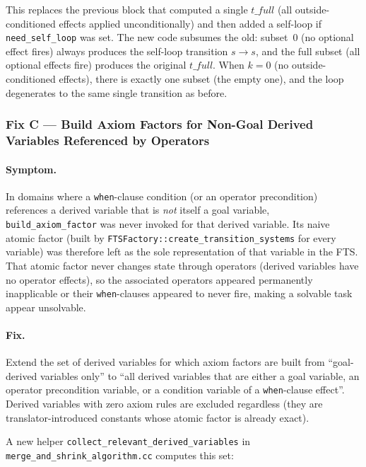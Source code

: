 \documentclass[11pt,a4paper]{article}
\begin{document}
This replaces the previous block that computed a single $t\_full$ (all
outside-conditioned effects applied unconditionally) and then added a
self-loop if \texttt{need\_self\_loop} was set.  The new code subsumes the
old: subset~$0$ (no optional effect fires) always produces the self-loop
transition $s \to s$, and the full subset (all optional effects fire) produces
the original $t\_full$.  When $k = 0$ (no outside-conditioned effects), there
is exactly one subset (the empty one), and the loop degenerates to the same
single transition as before.

\subsubsection{Fix C --- Build Axiom Factors for Non-Goal Derived Variables
Referenced by Operators}
\label{sec:fix-c}

\paragraph{Symptom.}
In domains where a \texttt{when}-clause condition (or an operator precondition)
references a derived variable that is \emph{not} itself a goal variable,
\texttt{build\_axiom\_factor} was never invoked for that derived variable.
Its naive atomic factor (built by \texttt{FTSFactory::create\_transition\_systems}
for every variable) was therefore left as the sole representation of that
variable in the FTS.  That atomic factor never changes state through operators
(derived variables have no operator effects), so the associated operators
appeared permanently inapplicable or their \texttt{when}-clauses appeared to
never fire, making a solvable task appear unsolvable.

\paragraph{Fix.}
Extend the set of derived variables for which axiom factors are built from
``goal-derived variables only'' to ``all derived variables that are either a
goal variable, an operator precondition variable, or a condition variable of a
\texttt{when}-clause effect''.  Derived variables with zero axiom rules are
excluded regardless (they are translator-introduced constants whose atomic
factor is already exact).

A new helper \texttt{collect\_relevant\_derived\_variables} in
\texttt{merge\_and\_shrink\_algorithm.cc} computes this set:
\end{document}
